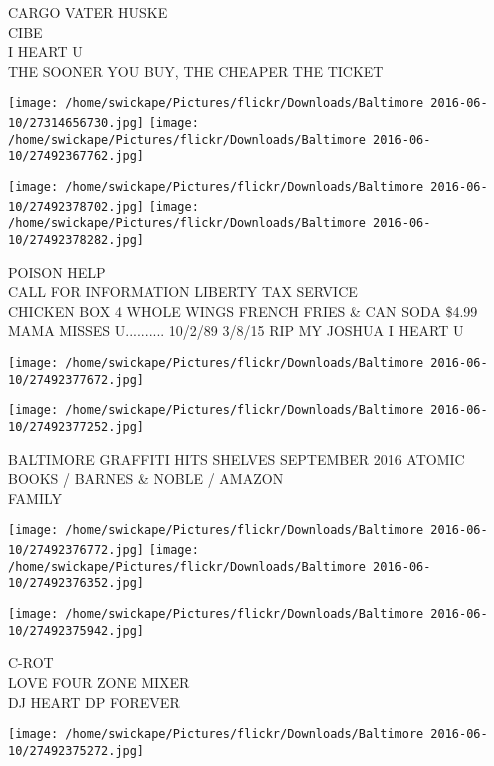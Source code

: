 \documentclass[10pt,letterpaper]{article}
\begin{document}
CARGO VATER HUSKE\\
CIBE\\
I HEART U\\
THE SOONER YOU BUY, THE CHEAPER THE TICKET\\
\pagebreak

\texttt{[image: /home/swickape/Pictures/flickr/Downloads/Baltimore 2016-06-10/27314656730.jpg]}
\texttt{[image: /home/swickape/Pictures/flickr/Downloads/Baltimore 2016-06-10/27492367762.jpg]}

\texttt{[image: /home/swickape/Pictures/flickr/Downloads/Baltimore 2016-06-10/27492378702.jpg]}
\texttt{[image: /home/swickape/Pictures/flickr/Downloads/Baltimore 2016-06-10/27492378282.jpg]}

POISON HELP\\
CALL FOR INFORMATION LIBERTY TAX SERVICE\\
CHICKEN BOX 4 WHOLE WINGS FRENCH FRIES \& CAN SODA \$4.99\\
MAMA MISSES U.......... 10/2/89 3/8/15 RIP MY JOSHUA I HEART U\\
\pagebreak

\texttt{[image: /home/swickape/Pictures/flickr/Downloads/Baltimore 2016-06-10/27492377672.jpg]}

\vspace{0.25in}
\texttt{[image: /home/swickape/Pictures/flickr/Downloads/Baltimore 2016-06-10/27492377252.jpg]}

BALTIMORE GRAFFITI HITS SHELVES SEPTEMBER 2016 ATOMIC BOOKS / BARNES \& NOBLE / AMAZON\\
FAMILY\\
\pagebreak

\texttt{[image: /home/swickape/Pictures/flickr/Downloads/Baltimore 2016-06-10/27492376772.jpg]}
\texttt{[image: /home/swickape/Pictures/flickr/Downloads/Baltimore 2016-06-10/27492376352.jpg]}

\texttt{[image: /home/swickape/Pictures/flickr/Downloads/Baltimore 2016-06-10/27492375942.jpg]}

C{-}ROT\\
LOVE FOUR ZONE MIXER\\
DJ HEART DP FOREVER\\
\pagebreak

\texttt{[image: /home/swickape/Pictures/flickr/Downloads/Baltimore 2016-06-10/27492375272.jpg]}
\end{document}
